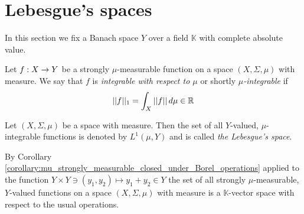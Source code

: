 \section{Lebesgue's spaces}\label{section:lebesgue_spaces}
\noindent
In this section we fix a Banach space $Y$ over a field $\mathbb{K}$ with complete absolute value.

\begin{definition}
Let $f:X\rightarrow Y$ be a strongly $\mu$-measurable function on a space $(X,\Sigma,\mu)$ with measure. We say that $f$ is \textit{integrable with respect to $\mu$} or shortly \textit{$\mu$-integrable} if
$$||f||_1 = \int_X||f||\,d\mu \in {\mathbb R}$$
\end{definition}

\begin{definition}
Let $(X,\Sigma,\mu)$ be a space with measure. Then the set of all $Y$-valued, $\mu$-integrable functions is denoted by $L^1(\mu,Y)$ and is called \textit{the Lebesgue's space}.
\end{definition}
\noindent
By Corollary \ref{corollary:mu_strongly_measurable_closed_under_Borel_operations} applied to the function $Y\times Y\ni (y_1,y_2) \mapsto y_1 + y_2 \in Y$ the set of all strongly $\mu$-measurable, $Y$-valued functions on a space $(X,\Sigma,\mu)$ with measure is a $\mathbb{K}$-vector space with respect to the usual operations.


